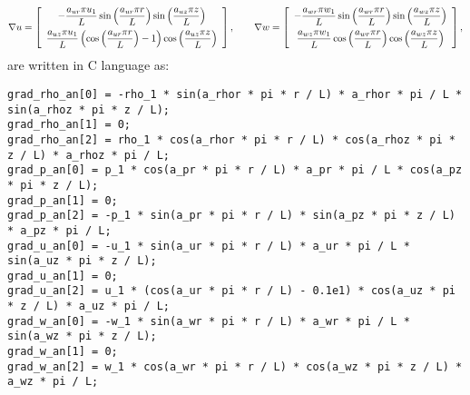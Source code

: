 \documentclass[a4paper,10pt]{article}
\begin{document}
\begin{landscape}
\begin{equation*}
\nabla u = \left[ \begin{array}{c}
 -\dfrac{ a_{ur}  \pi u_1}{L}   \sin\left(\dfrac{a_{ur}  \pi  r }{L}\right) \sin\left(\dfrac{a_{uz}  \pi  z }{L}\right)\vspace{5pt} \\
  \dfrac{ a_{uz}  \pi u_1}{L}  \left(\cos\left(\dfrac{a_{ur}  \pi  r }{L}\right) - 1\right)  \cos\left(\dfrac{a_{uz}  \pi  z }{L}\right)
\end{array} \right],
\qquad
\nabla w = \left[ \begin{array}{c}
 -\dfrac{ a_{wr}  \pi w_1}{L}  \sin\left(\dfrac{a_{wr}  \pi  r }{L}\right)  \sin\left(\dfrac{a_{wz}  \pi  z }{L}\right)\vspace{5pt} \\
  \dfrac{ a_{wz}  \pi  w_1}{L}  \cos\left(\dfrac{a_{wr}  \pi  r }{L}\right) \cos\left(\dfrac{a_{wz}  \pi  z }{L}\right)
\end{array} \right],
\end{equation*}
are written in C language as:
\begin{verbatim}
grad_rho_an[0] = -rho_1 * sin(a_rhor * pi * r / L) * a_rhor * pi / L * sin(a_rhoz * pi * z / L);
grad_rho_an[1] = 0;
grad_rho_an[2] = rho_1 * cos(a_rhor * pi * r / L) * cos(a_rhoz * pi * z / L) * a_rhoz * pi / L;
grad_p_an[0] = p_1 * cos(a_pr * pi * r / L) * a_pr * pi / L * cos(a_pz * pi * z / L);
grad_p_an[1] = 0;
grad_p_an[2] = -p_1 * sin(a_pr * pi * r / L) * sin(a_pz * pi * z / L) * a_pz * pi / L;
grad_u_an[0] = -u_1 * sin(a_ur * pi * r / L) * a_ur * pi / L * sin(a_uz * pi * z / L);
grad_u_an[1] = 0;
grad_u_an[2] = u_1 * (cos(a_ur * pi * r / L) - 0.1e1) * cos(a_uz * pi * z / L) * a_uz * pi / L;
grad_w_an[0] = -w_1 * sin(a_wr * pi * r / L) * a_wr * pi / L * sin(a_wz * pi * z / L);
grad_w_an[1] = 0;
grad_w_an[2] = w_1 * cos(a_wr * pi * r / L) * cos(a_wz * pi * z / L) * a_wz * pi / L;
\end{verbatim}







\end{landscape}
\end{document}
